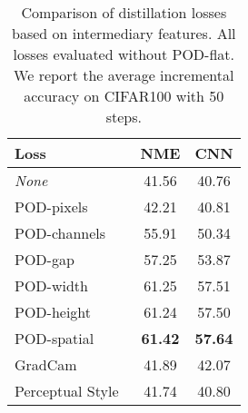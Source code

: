 \begin{table*}[!htbp]
    \centering
    \begin{tabular}{@{}lcc@{}}
        \toprule
        Loss                                                        & NME            & CNN            \\
        \midrule
        \textit{None}                                               & 41.56          & 40.76          \\
        POD-pixels                                                  & 42.21          & 40.81          \\
        POD-channels                                                & 55.91          & 50.34          \\
        POD-gap                                                     & 57.25          & 53.87          \\
        POD-width                                                   & 61.25          & 57.51          \\
        POD-height                                                  & 61.24          & 57.50          \\
        POD-spatial                                                 & \textbf{61.42} & \textbf{57.64} \\
        \hdashline
        GradCam~\citep{dhar2019learning_without_memorizing_gradcam} & 41.89          & 42.07          \\
        Perceptual Style~\citep{johnson2016perceptual_losses}       & 41.74          & 40.80          \\
        \bottomrule
    \end{tabular}
    \caption{Comparison of distillation losses based on intermediary features. All losses evaluated
        without POD-flat. We report the average incremental accuracy on CIFAR100 with 50 steps.}
    \label{tab:podnet_ablation_perceptual_noflat}
\end{table*}
